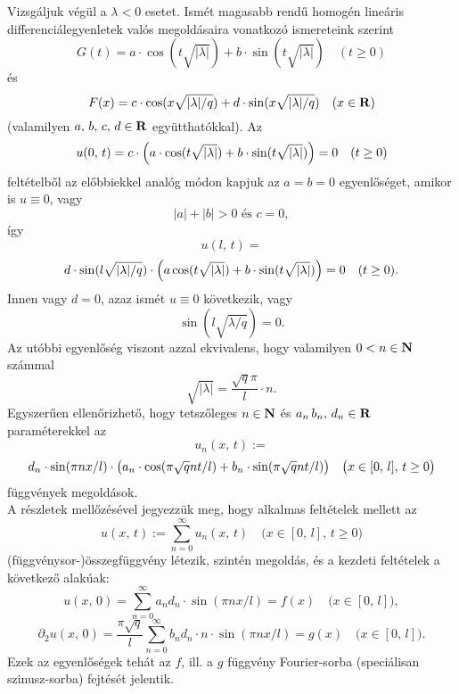 Vizsgáljuk végül a $\lambda < 0$ esetet. Ismét magasabb rendű homogén lineáris differenciálegyenletek valós megoldásaira vonatkozó ismereteink szerint
\[
	G(t) = a \cdot \cos(t \sqrt{|\lambda|}) + b \cdot \sin(t \sqrt{|\lambda|}) \quad (t \geq 0)
\]
és
\[
	F(x) = c \cdot \cos(x \sqrt{|\lambda| / q}) + d \cdot \sin(x \sqrt{|\lambda| / q}) \quad (x \in \mathbf{R})
\]
(valamilyen $a, \, b, \, c, \, d \in \mathbf{R}$ együtthatókkal). Az
\[
	u(0, \, t) = c \cdot \Big(  a \cdot \cos(t \sqrt{|\lambda|}) + b \cdot \sin(t\sqrt{|\lambda|})  \Big) = 0 \quad ( t \geq 0)
\]
feltételből az előbbiekkel analóg módon kapjuk az $a = b = 0$ egyenlőséget, amikor is $u \equiv 0$, vagy
\[
	|a| + |b| > 0 \text{ és } c = 0,
\]
így
\[
	u(l, \, t) =
\]
\[
	d \cdot \sin(l \sqrt{|\lambda| / q}) \cdot \Big(  a \cos(t\sqrt{|\lambda|})  + b \cdot \sin(t \sqrt{|\lambda|}) \Big) = 0 \quad (t \geq 0).
\]
Innen vagy $d = 0$, azaz ismét $u \equiv 0$ következik, vagy
\[
	\sin(l \sqrt{\lambda / q}) = 0.
\]
Az utóbbi egyenlőség viszont azzal ekvivalens, hogy valamilyen $0 < n \in \mathbf{N}$ számmal
\[
	\sqrt{|\lambda|} = \frac{\sqrt{q}\pi}{l}\cdot n.
\]
Egyszerűen ellenőrizhető, hogy tetszőleges $n \in \mathbf{N}$ és $a_n \, b_n, \, d_n \in \mathbf{R}$ paraméterekkel az
\[
	u_n(x, \, t) :=
\]
\[
	d_n \cdot \sin(\pi n x /l) \cdot \big(  a_n \cdot \cos(\pi \sqrt{q} n t / l)  + b_n \cdot \sin(\pi \sqrt{q} n t / l) \big) \quad \big(x \in [0, \, l], \, t \geq 0\big)
\]
függvények megoldások.\\

A részletek mellőzésével jegyezzük meg, hogy alkalmas feltételek mellett az
\[
	u(x, \, t) := \sum_{n=0}^\infty u_n (x, \, t) \quad \big(x \in [0, \, l], \, t \geq 0 \big)
\]
(függvénysor-)összegfüggvény létezik, szintén megoldás, és a kezdeti feltételek a következő alakúak:
\[
	u(x, \, 0) = \sum_{n=0}^\infty a_n d_n \cdot \sin(\pi n x / l) = f(x) \quad \big(x \in [0, \, l]\big),
\]
\[
	\partial_2u(x, \, 0) = \frac{\pi \sqrt{q}}{l} \sum_{n=0}^\infty b_n d_n \cdot n \cdot \sin(\pi n x / l) = g(x) \quad \big(x \in [0, \, l]\big).
\]
Ezek az egyenlőségek tehát az $f$, ill. a $g$ függvény Fourier-sorba (speciálisan szinusz-sorba) fejtését jelentik. 
